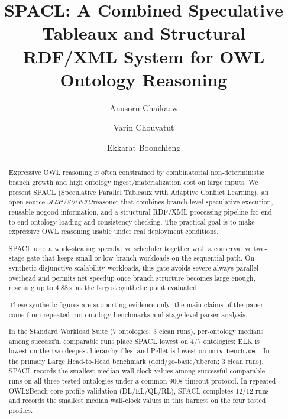\documentclass[preprint,12pt,times]{elsarticle}
\newcommand{\dlfrag}{\ensuremath{\mathcal{ALC/SHOIQ}}}
\begin{document}
\begin{frontmatter}

\title{SPACL: A Combined Speculative Tableaux and Structural RDF/XML System for OWL Ontology Reasoning}

\author[1]{Anusorn Chaikaew}

\author[1]{Varin Chouvatut}

\author[1]{Ekkarat Boonchieng}



\begin{abstract}
Expressive OWL reasoning is often constrained by combinatorial non-deterministic branch growth and high ontology ingest/materialization cost on large inputs. We present SPACL (Speculative Parallel Tableaux with Adaptive Conflict Learning), an open-source \dlfrag reasoner that combines branch-level speculative execution, reusable nogood information, and a structural RDF/XML processing pipeline for end-to-end ontology loading and consistency checking. The practical goal is to make expressive OWL reasoning usable under real deployment conditions.

SPACL uses a work-stealing speculative scheduler together with a conservative two-stage gate that keeps small or low-branch workloads on the sequential path. On synthetic disjunctive scalability workloads, this gate avoids severe always-parallel overhead and permits net speedup once branch structure becomes large enough, reaching up to 4.88$\times$ at the largest synthetic point evaluated.

These synthetic figures are supporting evidence only; the main claims of the paper come from repeated-run ontology benchmarks and stage-level parser analysis.

In the Standard Workload Suite (7 ontologies; 3 clean runs), per-ontology medians among successful comparable runs place SPACL lowest on 4/7 ontologies; ELK is lowest on the two deepest hierarchy files, and Pellet is lowest on \texttt{univ-bench.owl}. In the primary Large Head-to-Head benchmark (doid/go-basic/uberon; 3 clean runs), SPACL records the smallest median wall-clock values among successful comparable runs on all three tested ontologies under a common 900s timeout protocol. In repeated OWL2Bench core-profile validation (DL/EL/QL/RL), SPACL completes 12/12 runs and records the smallest median wall-clock values in this harness on the four tested profiles.


\end{abstract}
\end{frontmatter}
\end{document}
